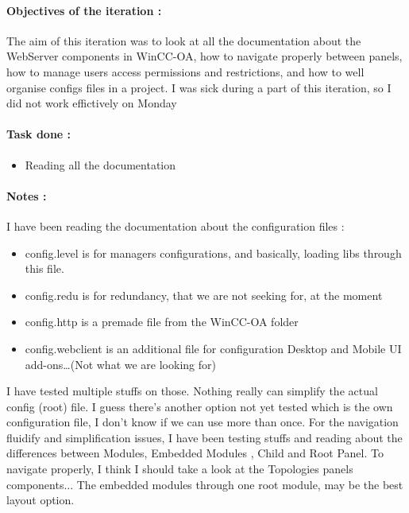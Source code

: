 \documentclass[../main.tex]{subfiles}
\begin{document}
\begin{appendix}
    \paragraph{Objectives of the iteration :}
    The aim of this iteration was to look at all the documentation about the WebServer components in WinCC-OA, how to navigate properly between panels, how to manage users access permissions and restrictions, and how to well organise configs files in a project. I was sick during a part of this iteration, so I did not work effictively on Monday
    \paragraph{Task done :}
    \begin{itemize}
        \item Reading all the documentation
    \end{itemize}

    \paragraph{Notes :} 
    I have been reading the documentation about the configuration files :
    \begin{itemize}
        \item config.level is for managers configurations, and basically, loading libs through this file.
        \item config.redu is for redundancy, that we are not seeking for, at the moment
        \item config.http is a premade file from the WinCC-OA folder
        \item config.webclient is an additional file for configuration Desktop and Mobile UI add-ons\dots (Not what we are looking for)
    \end{itemize}
    I have tested multiple stuffs on those. Nothing really can simplify the actual config (root) file.
    I guess there's another option not yet tested which is the own configuration file, I don't know if we can use more than once.\newline
    For the navigation fluidify and simplification issues, I have been testing stuffs and reading about the differences between Modules, Embedded Modules , Child and Root Panel.\newline
    To navigate properly, I think I should take a look at the Topologies panels components... The embedded modules through one root module, may be the best layout option.


\end{appendix}
\end{document}

